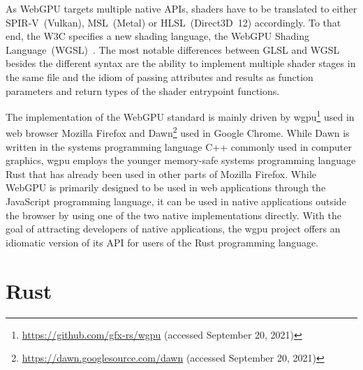 As WebGPU targets multiple native APIs, shaders have to be translated to either SPIR-V~(Vulkan), MSL~(Metal) or HLSL~(Direct3D~12) accordingly.
To that end, the W3C specifies a new shading language, the WebGPU Shading Language~(WGSL)~\cite{netoWebGPUShadingLanguage2021}.
The most notable differences between GLSL and WGSL besides the different syntax are the ability to implement multiple shader stages in the same file and the idiom of passing attributes and results as function parameters and return types of the shader entrypoint functions.

The implementation of the WebGPU standard is mainly driven by wgpu\footnote{\url{https://github.com/gfx-rs/wgpu} (accessed September 20, 2021)} used in web browser Mozilla Firefox and Dawn\footnote{\url{https://dawn.googlesource.com/dawn} (accessed September 20, 2021)} used in Google Chrome.
While Dawn is written in the systems programming language C++ commonly used in computer graphics, wgpu employs the younger memory-safe systems programming language Rust that has already been used in other parts of Mozilla Firefox.
While WebGPU is primarily designed to be used in web applications through the JavaScript programming language, it can be used in native applications outside the browser by using one of the two native implementations directly.
With the goal of attracting developers of native applications, the wgpu project offers an idiomatic version of its API for users of the Rust programming language.

\section{Rust}

